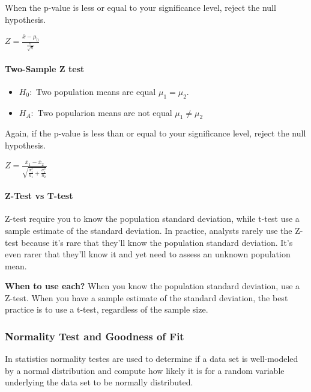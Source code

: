 \documentclass[11pt]{article}
\providecommand{\tightlist}{%
      \setlength{\itemsep}{0pt}\setlength{\parskip}{0pt}}
\begin{document}
When the p-value is less or equal to your significance level, reject the
null hypothesis.

\(Z = \frac{\bar{x} - \mu_0}{\frac{\sigma}{\sqrt{n}}}\)

\hypertarget{two-sample-z-test}{%
\paragraph{Two-Sample Z test}\label{two-sample-z-test}}

\begin{itemize}
\tightlist
\item
  \(H_0:\) Two population means are equal \(\mu_1 = \mu_2\).
\item
  \(H_A:\) Two popularion means are not equal \(\mu_1 \neq \mu_2\)
\end{itemize}

Again, if the p-value is less than or equal to your significance level,
reject the null hypothesis.

\(Z = \frac{\bar{x}_1 - \bar{x}_2}{\sqrt{\frac{\sigma^2_1}{n_1} + \frac{\sigma^2_1}{n_2}}}\)

\hypertarget{z-test-vs-t-test}{%
\paragraph{Z-Test vs T-test}\label{z-test-vs-t-test}}

Z-test require you to know the population standard deviation, while
t-test use a sample estimate of the standard deviation. In practice,
analysts rarely use the Z-test because it's rare that they'll know the
population standard deviation. It's even rarer that they'll know it and
yet need to assess an unknown population mean.

\textbf{When to use each?} When you know the population standard
deviation, use a Z-test. When you have a sample estimate of the standard
deviation, the best practice is to use a t-test, regardless of the
sample size.

\hypertarget{normality-test-and-goodness-of-fit}{%
\subsubsection{Normality Test and Goodness of
Fit}\label{normality-test-and-goodness-of-fit}}

In statistics normality testes are used to determine if a data set is
well-modeled by a normal distribution and compute how likely it is for a
random variable underlying the data set to be normally distributed.
\end{document}
